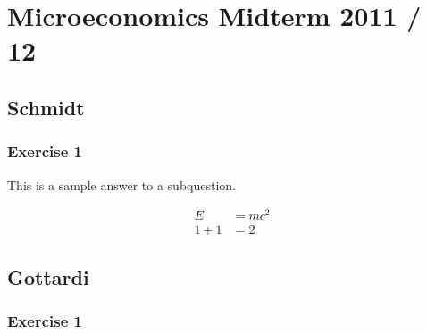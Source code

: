\section*{Microeconomics Midterm 2011 / 12}

{
\subsection*{Schmidt}

\subsubsection*{Exercise 1}

\begin{enumerate}[label=(\alph*)]
{\item 
This is a sample answer to a subquestion.

\begin{align*}
    E &= mc^2 \\
    1 + 1 &= 2
\end{align*}
}
\end{enumerate}
}

{
\subsection*{Gottardi}

\subsubsection*{Exercise 1}
}
